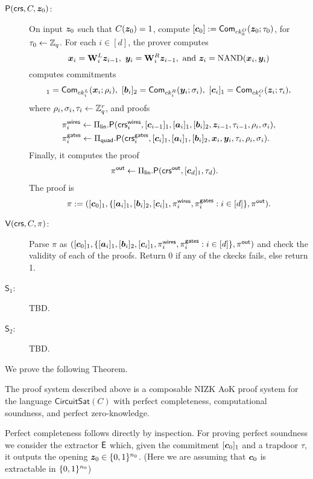 \begin{description}
\item[{$\mathsf{P}(\mathsf{crs}, C, {\boldsymbol{z}}_0)$}:]
On input ${\boldsymbol{z}}_0$ such that $C({\boldsymbol{z}}_0)=1$, compute $[{\boldsymbol{c}}_0]:=\mathsf{Com}_{ck_0^O}({\boldsymbol{z}}_0;\tau_0)$, for $\tau_0\gets\mathbb{Z}_q$. For each $i\in[d]$, the prover computes
$$
{\boldsymbol{x}}_{i} = \mathbf{{W}}^L_{i}{\boldsymbol{z}}_{i-1},\ {\boldsymbol{y}}_{i} = \mathbf{{W}}^R_{i}{\boldsymbol{z}}_{i-1},\text{ and }{\boldsymbol{z}}_i = \mathrm{NAND}({\boldsymbol{x}}_i,{\boldsymbol{y}}_i)
$$
computes commitments
\begin{align*}
[\vecb{a}_i]_1 = \mathsf{Com}_{ck_i^L}(\vecb{x}_i;\rho_i),\ 
[\vecb{b}_i]_2 = \mathsf{Com}_{ck_i^R}(\vecb{y}_i;\sigma_i),\ 
[\vecb{c}_i]_1 = \mathsf{Com}_{ck_i^O}(\vecb{z}_i;\tau_i),
\end{align*}
where $\rho_i,\sigma_i,\tau_i\gets\mathbb{Z}_q^r$, and proofs
\begin{align*}
&\pi_i^\mathsf{wires}\gets\Pi_\mathsf{lin}.\mathsf{P}(\mathsf{crs}_i^\mathsf{wires},[{\boldsymbol{c}}_{i-1}]_1,[{\boldsymbol{a}}_i]_1,[{\boldsymbol{b}}_i]_2,{\boldsymbol{z}}_{i-1},\tau_{i-1},\rho_i,\sigma_i),\\
&\pi_i^\mathsf{gates}\gets\Pi_\mathsf{quad}.\mathsf{P}(\mathsf{crs}_i^\mathsf{gates},[{\boldsymbol{c}}_{i}]_1,[{\boldsymbol{a}}_i]_1,[{\boldsymbol{b}}_i]_2,{\boldsymbol{x}}_i,{\boldsymbol{y}}_i,\tau_{i},\rho_i,\sigma_i).
\end{align*}
Finally, it computes the proof
\begin{align*}
&\pi^{\mathsf{out}} \gets \Pi_{\mathsf{lin}}.\mathsf{P}(\mathsf{crs}^\mathsf{out}, [{\boldsymbol{c}}_d]_1,\tau_d).
\end{align*}
The proof is
$$\pi:=([{\boldsymbol{c}}_0]_1,\{[{\boldsymbol{a}}_i]_1,[{\boldsymbol{b}}_i]_2,[{\boldsymbol{c}}_i]_1,\pi^\mathsf{wires}_i,\pi^\mathsf{gates}_i:i\in[d]\},\pi^\mathsf{out}).$$
\item[{\(\mathsf{V}(\mathsf{crs},C,\pi)\)}:]
Parse $\pi$ as $([{\boldsymbol{c}}_0]_1,\{[{\boldsymbol{a}}_i]_1,[{\boldsymbol{b}}_i]_2,[{\boldsymbol{c}}_i]_1,\pi^\mathsf{wires}_i,\pi^\mathsf{gates}_i:i\in[d]\},\pi^\mathsf{out})$ and check the validity of each of the proofs. Return 0 if any of the ckecks fails, else return 1.

\item[$\mathsf{S}_1$:] TBD.

\item[$\mathsf{S}_2$:] TBD.
\end{description}

We prove the following Theorem.

\begin{theorem} \label{theo:bits}
The proof system described above is a composable NIZK AoK proof system for the language \(\mathsf{CircuitSat}(C)\)
 with perfect completeness, computational soundness, and perfect zero-knowledge.
\end{theorem}	
Perfect completeness follows directly by inspection.
For proving perfect soundness we consider the extractor $\mathsf{E}$ which, given the commitment $[{\boldsymbol{c}}_0]_1$ and a trapdoor $\tau$, it outputs the opening ${\boldsymbol{z}}_0\in\{0,1\}^{n_0}$. (Here we are assuming that ${\boldsymbol{c}}_0$ is extractable in $\{0,1\}^{n_0}$)

